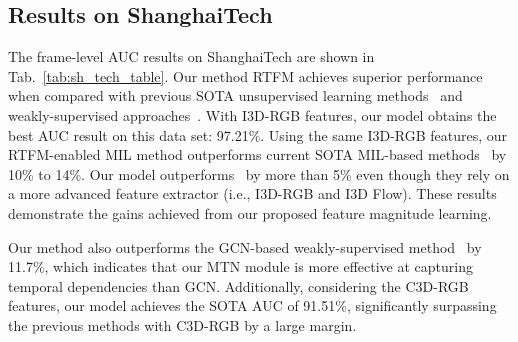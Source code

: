 \documentclass[final]{cvpr}
\begin{document}
\subsection{Results on ShanghaiTech}
The frame-level AUC results on ShanghaiTech are shown in Tab.~\ref{tab:sh_tech_table}. Our method RTFM achieves superior performance when compared with previous SOTA unsupervised learning methods~\cite{hasan2016learning,luo2017revisit,liu2018future,Park_2020_CVPR,yu2020cloze} and weakly-supervised approaches~\cite{9102722,8803657,zhong2019graph}. With I3D-RGB features, our model obtains the best AUC result on this data set: 97.21\%. Using the same I3D-RGB features, our RTFM-enabled MIL method outperforms current SOTA MIL-based methods~\cite{sultani2018real,8803657,9102722} by 10\% to 14\%. Our model outperforms~\cite{9102722} by more than 5\% even though they rely on a more advanced feature extractor (i.e., I3D-RGB and I3D Flow). These results demonstrate the gains achieved from our proposed feature magnitude learning.


Our method also outperforms the GCN-based weakly-supervised method~\cite{zhong2019graph} by  11.7\%, which indicates that our MTN module is more effective at capturing temporal dependencies than GCN. 
Additionally, considering the C3D-RGB features, our model achieves the SOTA AUC of 91.51\%, significantly surpassing the previous methods with C3D-RGB by a large margin. 
\end{document}
